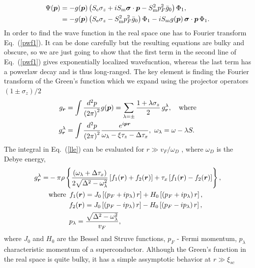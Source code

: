 \documentclass[twocolumn,showpacs,floatfix,nofootinbib,longbibliography]{revtex4-1}
\begin{document}
\begin{align}
	\Psi(\bm p) &= - g(\bm p) \left( S_{\rm e}\sigma_z +  i S_{\rm m}  \bm \sigma\cdot \bm  p -S^2_{\rm m}p_F^2\bar g_0\right)\Phi_1,  \nonumber \\
	&= - g(\bm p) \left( S_{\rm e}\sigma_z  - S^2_{\rm m}p_F^2\bar g_0\right)\Phi_1 -   i  S_{\rm m} g(\bm p)\,  \bm \sigma\cdot \bm  p \,\Phi_1. \label{pwf1} 	
\end{align}
In order to find the wave function in the real space one has to Fourier transform Eq.~(\ref{pwf1}). It can be done carefully but the resulting equations are bulky and obscure, so we are just going to show that the first term in the second line of Eq.~(\ref{pwf1}) gives exponentially localized wavefucntion, whereas the last term has a powerlaw decay and is thus long-ranged. The key element is finding the Fourier transform of the Green's function
which we expand using the projector operators $(1\pm \sigma_z)/2$
\begin{align}
	g_{\bm r} &= \int \frac{d^2 p}{\left( 2\pi \right)^2} g(\bm p) =   \sum_{\lambda = \pm} \frac{1+\lambda\sigma_z}{2}\,g_{\bm r}^\lambda \nonumber,\quad{\rm where} \\
	 g_{\bm r}^\lambda &=\int \frac{d^2 p}{\left( 2\pi \right)^2} \frac{e^{i\bm p \bm r}}{\omega_\lambda -\xi\tau_z-\Delta\tau_x},\,\,\omega_\lambda = \omega - \lambda S.  \label{lle}
\end{align}
 The integral in Eq.~(\ref{lle}) can be evaluated for $r\gg v_F/\omega_D$ \cite{Pientka2013}, where $\omega_D$ is the Debye energy,
\begin{align}
	g^\lambda_{\bm r} = & -\pi\rho\left\{\frac{(\omega_\lambda+\Delta\tau_x)}{2\sqrt{\Delta^2-\omega_\lambda^2}}\left[ f_1(\bm r)+f_2(\bm r) \right] + \tau_x \left[ f_1(\bm r)-f_2(\bm r) \right]\right\}, \nonumber \\
	& {\rm where}\,\,\, f_1(\bm r) = J_0\left[\left( p_F+ip_\lambda \right)r\right] + H_0\left[\left( p_F+ip_\lambda \right)r\right], \nonumber\\ 
	& \qquad\quad f_2(\bm r) = J_0\left[\left( p_F-ip_\lambda \right)r\right] - H_0\left[\left( p_F-ip_\lambda \right)r\right], \nonumber\\
	& \qquad\quad p_\lambda = \frac{\sqrt{\Delta^2-\omega^2_\lambda}}{v_F},
\end{align}
where $J_0$ and $H_0$ are the Bessel and Struve functions, $p_F$ - Fermi momentum, $p_\lambda$ characteristic momentum of a superconductor. Although the Green's function in the real space is quite bulky, it has a simple assymptotic behavior at $r\gg \xi_{sc}$
\end{document}
